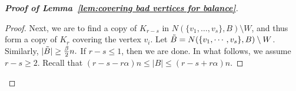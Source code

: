 \documentclass[11pt, a4paper]{article}
\theoremstyle{definition}
\newcommand{\<}{\subseteq}
\newcommand{\de}{\delta}
\begin{document}
\begin{proof}[{\bf Proof of Lemma~\ref{lem:covering bad vertices for balance}}]
\begin{proof}
Next, we are to find a copy of $K_{r-s}$ in $N(\{v_1,\ldots,v_s\},B) \setminus W$, and thus form a copy of $K_r$ covering the vertex $v_i$. Let $\Tilde{B}=N(\{v_1,\cdots,v_s\},B)\setminus W$. Similarly, 
$
|\Tilde{B}|\geq \frac{\beta}{2}n
.$ 
If $r-s\le 1$, then we are done. In what follows, we assume $r-s\ge 2$. Recall that $(r-s-r\alpha)n\leq |B|\leq (r-s+r\alpha)n$. %

\end{proof}
\end{proof}
\end{document}
